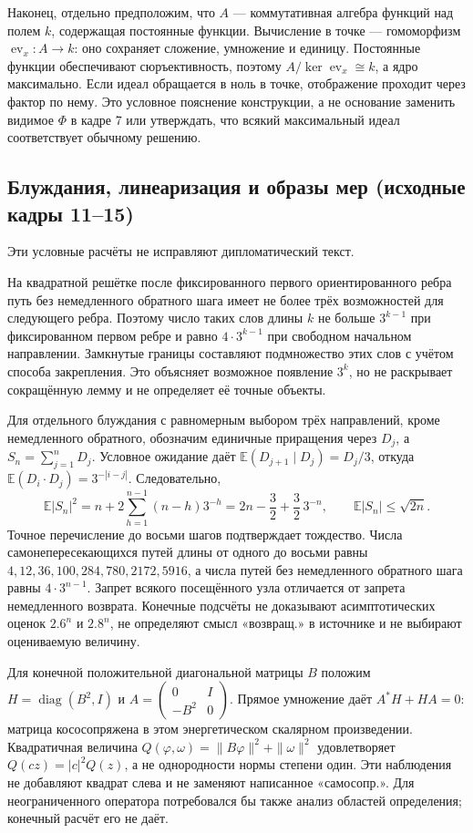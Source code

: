 \documentclass[11pt]{article}
\begin{document}
Наконец, отдельно предположим, что \(A\) — коммутативная алгебра функций над полем \(k\), содержащая постоянные функции. Вычисление в точке — гомоморфизм \(\operatorname{ev}_x:A\to k\): оно сохраняет сложение, умножение и единицу. Постоянные функции обеспечивают сюръективность, поэтому \(A/\ker\operatorname{ev}_x\cong k\), а ядро максимально. Если идеал обращается в ноль в точке, отображение проходит через фактор по нему. Это условное пояснение конструкции, а не основание заменить видимое \(\Phi\) в кадре 7 или утверждать, что всякий максимальный идеал соответствует обычному решению.


\subsection*{Блуждания, линеаризация и образы мер (исходные кадры 11--15)}
Эти условные расчёты не исправляют дипломатический текст.

На квадратной решётке после фиксированного первого ориентированного ребра путь без немедленного обратного шага имеет не более трёх возможностей для следующего ребра. Поэтому число таких слов длины $k$ не больше $3^{k-1}$ при фиксированном первом ребре и равно $4\cdot3^{k-1}$ при свободном начальном направлении. Замкнутые границы составляют подмножество этих слов с учётом способа закрепления. Это объясняет возможное появление $3^k$, но не раскрывает сокращённую лемму и не определяет её точные объекты.

Для отдельного блуждания с равномерным выбором трёх направлений, кроме немедленного обратного, обозначим единичные приращения через $D_j$, а $S_n=\sum_{j=1}^nD_j$. Условное ожидание даёт $\mathbb E(D_{j+1}\mid D_j)=D_j/3$, откуда $\mathbb E(D_i\cdot D_j)=3^{-|i-j|}$. Следовательно,
\[
\mathbb E|S_n|^2=n+2\sum_{h=1}^{n-1}(n-h)3^{-h}
=2n-\frac32+\frac32\,3^{-n},\qquad
\mathbb E|S_n|\leq\sqrt{2n}.
\]
Точное перечисление до восьми шагов подтверждает тождество. Числа самонепересекающихся путей длины от одного до восьми равны $4,12,36,100,284,780,2172,5916$, а числа путей без немедленного обратного шага равны $4\cdot3^{n-1}$. Запрет всякого посещённого узла отличается от запрета немедленного возврата. Конечные подсчёты не доказывают асимптотических оценок $2.6^n$ и $2.8^n$, не определяют смысл «возвращ.» в источнике и не выбирают оцениваемую величину.

Для конечной положительной диагональной матрицы $B$ положим $H=\operatorname{diag}(B^2,I)$ и $A=\left(\begin{smallmatrix}0&I\\-B^2&0\end{smallmatrix}\right)$. Прямое умножение даёт $A^*H+HA=0$: матрица кососопряжена в этом энергетическом скалярном произведении. Квадратичная величина $Q(\varphi,\omega)=\|B\varphi\|^2+\|\omega\|^2$ удовлетворяет $Q(cz)=|c|^2Q(z)$, а не однородности нормы степени один. Эти наблюдения не добавляют квадрат слева и не заменяют написанное «самосопр.». Для неограниченного оператора потребовался бы также анализ областей определения; конечный расчёт его не даёт.
\end{document}
